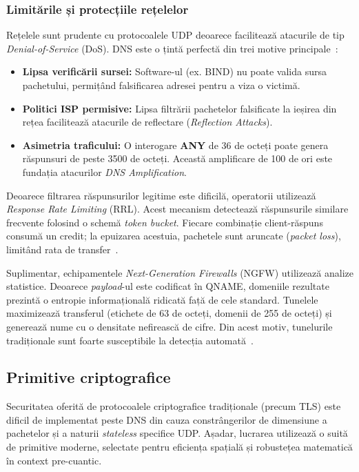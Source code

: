 \subsubsection{Limitările și protecțiile rețelelor}
Rețelele sunt prudente cu protocoalele UDP deoarece facilitează atacurile de tip \textit{Denial-of-Service} (DoS). DNS este o țintă perfectă din trei motive principale~\cite{isc_rrl}:

\begin{itemize}
    \item \textbf{Lipsa verificării sursei:} Software-ul (ex. BIND) nu poate valida sursa pachetului, permițând falsificarea adresei pentru a viza o victimă.
    \item \textbf{Politici ISP permisive:} Lipsa filtrării pachetelor falsificate la ieșirea din rețea facilitează atacurile de reflectare (\textit{Reflection Attacks}).
    \item \textbf{Asimetria traficului:} O interogare \textbf{ANY} de 36 de octeți poate genera răspunsuri de peste 3500 de octeți. Această amplificare de 100 de ori este fundația atacurilor \textit{DNS Amplification}.
\end{itemize}

Deoarece filtrarea răspunsurilor legitime este dificilă, operatorii utilizează \textit{Response Rate Limiting} (RRL). Acest mecanism detectează răspunsurile similare frecvente folosind o schemă \textit{token bucket}. Fiecare combinație client-răspuns consumă un credit; la epuizarea acestuia, pachetele sunt aruncate (\textit{packet loss}), limitând rata de transfer~\cite{isc_rrl}.

Suplimentar, echipamentele \textit{Next-Generation Firewalls} (NGFW) utilizează analize statistice. Deoarece \textit{payload}-ul este codificat în QNAME, domeniile rezultate prezintă o entropie informațională ridicată față de cele standard. Tunelele maximizează transferul (etichete de 63 de octeți, domenii de 255 de octeți) și generează nume cu o densitate nefirească de cifre. Din acest motiv, tunelurile tradiționale sunt foarte susceptibile la detecția automată~\cite{farnham_dns_tunneling}.

\subsection{Primitive criptografice}
Securitatea oferită de protocoalele criptografice tradiționale (precum TLS) este dificil de implementat peste DNS din cauza constrângerilor de dimensiune a pachetelor și a naturii \textit{stateless} specifice UDP. Așadar, lucrarea utilizează o suită de primitive moderne, selectate pentru eficiența spațială și robustețea matematică în context pre-cuantic.

